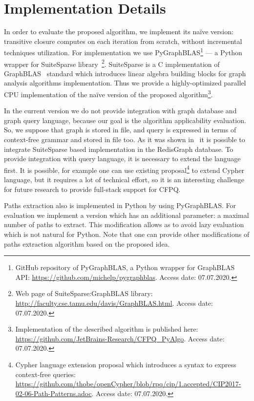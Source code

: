 \section{Implementation Details}

In order to evaluate the proposed algorithm, we implement its na{\"i}ve version: transitive closure computes on each iteration from scratch, without incremental techniques utilization. 
For implementation we use PyGraphBLAS\footnote{GitHub repository of PyGraphBLAS, a Python wrapper for GraphBLAS API: \url{https://github.com/michelp/pygraphblas}. Access date: 07.07.2020.} --- a Python wrapper for SuiteSparse library~\cite{10.1145/3322125}\footnote{Web page of SuiteSparse:GraphBLAS library: \url{http://faculty.cse.tamu.edu/davis/GraphBLAS.html}. Access date: 07.07.2020.}. 
SuiteSparse is a C implementation of GraphBLAS~\cite{7761646} standard which introduces linear algebra building blocks for graph analysis algorithms implementation.
Thus we provide a highly-optimized parallel CPU implementation of the na{\"i}ve version of the proposed algorithm\footnote{Implementation of the described algorithm is published here: \url{https://github.com/JetBrains-Research/CFPQ_PyAlgo}. Access date: 07.07.2020.}. 

In the current version we do not provide integration with graph database and graph query language, because our goal is the algorithm applicability evaluation.
So, we suppose that graph is stored in file, and query is expressed in terms of context-free grammar and stored in file too.
As it was shown in~\cite{10.1145/3398682.3399163} it is possible to integrate SuiteSparse based implementation in the RedisGraph database. 
To provide integration with query language, it is necessary to extend the language first.
It is possible, for example one can use existing proposal\footnote{Cypher language extension proposal which introduces a syntax to express context-free queries: \url{https://github.com/thobe/openCypher/blob/rpq/cip/1.accepted/CIP2017-02-06-Path-Patterns.adoc}. Access date: 07.07.2020.} to extend Cypher language, but it requires a lot of technical effort, so it is an interesting challenge for future research to provide full-stack support for CFPQ.     

Paths extraction also is implemented in Python by using PyGraphBLAS. 
For evaluation we implement a version which has an additional parameter: a maximal number of paths to extract. 
This modification allows as to avoid lazy evaluation which is not natural for Python.
Note that one can provide other modifications of paths extraction algorithm based on the proposed idea.